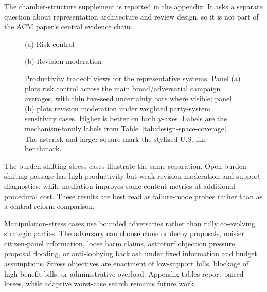 \documentclass[manuscript]{acmart}
\begin{document}
The chamber-structure supplement is reported in the appendix. It asks a separate question about representation architecture and review design, so it is not part of the ACM paper's central evidence chain.

\begin{figure}[!htbp]
  \centering
  \begin{minipage}[t]{0.49\textwidth}
    \centering
    \resizebox{\linewidth}{!}{}
    \vspace{-0.75\baselineskip}
    \centerline{\small (a) Risk control}
  \end{minipage}\hfill
  \begin{minipage}[t]{0.49\textwidth}
    \centering
    \resizebox{\linewidth}{!}{}
    \vspace{-0.75\baselineskip}
    \centerline{\small (b) Revision moderation}
  \end{minipage}
  \caption{Productivity tradeoff views for the representative systems. Panel (a) plots risk control across the main broad/adversarial campaign averages, with thin five-seed uncertainty bars where visible; panel (b) plots revision moderation under weighted party-system sensitivity cases. Higher is better on both y-axes. Labels are the mechanism-family labels from Table~\ref{tab:design-space-coverage}. The asterisk and larger square mark the stylized U.S.-like benchmark.}
  \label{fig:productivity-tradeoffs}
\end{figure}

The burden-shifting stress cases illustrate the same separation. Open burden-shifting passage has high productivity but weak revision-moderation and support diagnostics, while mediation improves some content metrics at additional procedural cost. These results are best read as failure-mode probes rather than as a central reform comparison.

Manipulation-stress cases use bounded adversaries rather than fully co-evolving strategic parties. The adversary can choose clone or decoy proposals, noisier citizen-panel information, loose harm claims, astroturf objection pressure, proposal flooding, or anti-lobbying backlash under fixed information and budget assumptions. Stress objectives are enactment of low-support bills, blockage of high-benefit bills, or administrative overload. Appendix tables report paired losses, while adaptive worst-case search remains future work.
\end{document}
